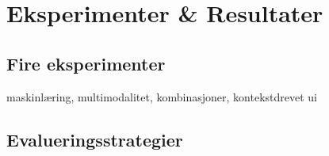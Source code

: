 \section[Eksperimenter \& Resultater]{Eksperimenter \& Resultater}
\subsection{Fire eksperimenter}
maskinlæring, multimodalitet, kombinasjoner, kontekstdrevet ui

\subsection{Evalueringsstrategier}





